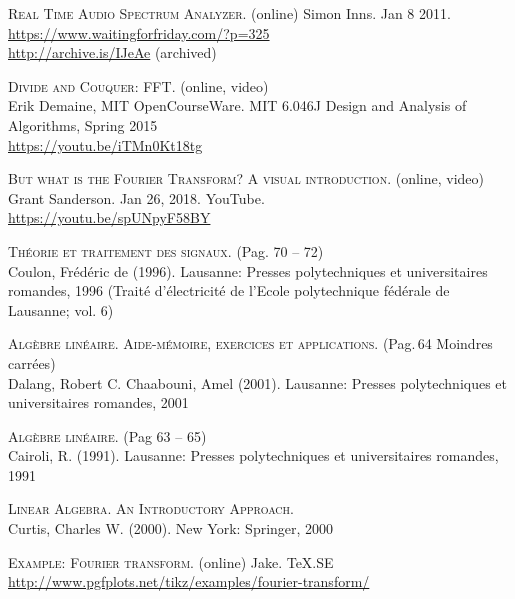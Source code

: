 \begin{thebibliography}{2}

    \textsc{Real Time Audio Spectrum Analyzer}. (online) 
    Simon Inns. Jan 8 2011. \\
    \url{https://www.waitingforfriday.com/?p=325} \\
    \url{http://archive.is/IJeAe} (archived)

    \textsc{Divide and Couquer: FFT}. (online, video) \\
    Erik Demaine, MIT OpenCourseWare.
    MIT 6.046J Design and Analysis of Algorithms, Spring 2015 \\
    \url{https://youtu.be/iTMn0Kt18tg}

    \textsc{But what is the Fourier Transform? A visual introduction}. (online, video) \\
    Grant Sanderson. Jan 26, 2018. YouTube. \\
    \url{https://youtu.be/spUNpyF58BY}

    \textsc{Théorie et traitement des signaux}. (Pag. 70 -- 72) \\
    Coulon, Frédéric de (1996).
    Lausanne: Presses polytechniques et universitaires romandes, 1996
    (Traité d'électricité de l'Ecole polytechnique fédérale de Lausanne; vol. 6)

    \textsc{Algèbre linéaire. Aide-mémoire, exercices et applications}. (Pag.\,64 Moindres carrées) \\
    Dalang, Robert C. Chaabouni, Amel (2001). 
    Lausanne: Presses polytechniques et universitaires romandes, 2001

    \textsc{Algèbre linéaire}. (Pag 63 -- 65)\\
    Cairoli, R. (1991).
    Lausanne: Presses polytechniques et universitaires romandes, 1991

    \textsc{Linear Algebra. An Introductory Approach.} \\
    Curtis, Charles W. (2000).
    New York: Springer, 2000


    \textsc{Example: Fourier transform}. (online)
    Jake. TeX.SE \\
    \url{http://www.pgfplots.net/tikz/examples/fourier-transform/}

\end{thebibliography}

\listoffigures
\begingroup
\let\clearpage\relax
\vspace{15mm}
\listoftables
\endgroup
